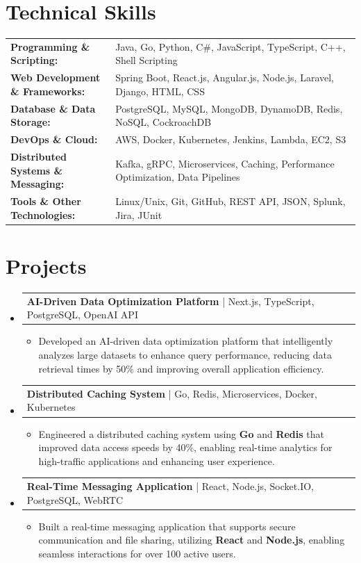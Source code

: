 \documentclass[letterpaper,10pt]{article}
\makeatletter
\newcommand{\resumeItem}[1]{
  \item{\fontsize{8pt}{9pt}\selectfont
    #1 \vspace{-3pt}
  }
}
\newcommand{\resumeProjectHeading}[2]{
    \item
    \begin{tabular*}{1.001\textwidth}{l@{\extracolsep{\fill}}r}
      \fontsize{8.5pt}{10pt}#1 & \textbf{\fontsize{8.5pt}{10pt} #2}\\
    \end{tabular*}\vspace{-7pt}
}
\newcommand{\resumeSubHeadingListStart}{\begin{itemize}[leftmargin=0pt, label={}]}
\newcommand{\resumeSubHeadingListEnd}{\end{itemize}}
\newcommand{\resumeItemListStart}{\begin{itemize}[leftmargin=*]}
\newcommand{\resumeItemListEnd}{\end{itemize}\vspace{-5pt}}
\makeatother
\begin{document}
\section{Technical Skills}
        \vspace{-14pt}
        \begin{table}[h]
            \fontsize{8pt}{9pt}\selectfont
            \begin{tabular}{p{0.3\linewidth} p{0.7\linewidth}}
                \textbf{Programming \& Scripting:} & Java, Go, Python, C\#, JavaScript, TypeScript, C++, Shell Scripting \\
                \textbf{Web Development \& Frameworks:} & Spring Boot, React.js, Angular.js, Node.js, Laravel, Django, HTML, CSS \\
                \textbf{Database \& Data Storage:} & PostgreSQL, MySQL, MongoDB, DynamoDB, Redis, NoSQL, CockroachDB \\
                \textbf{DevOps \& Cloud:} & AWS, Docker, Kubernetes, Jenkins, Lambda, EC2, S3 \\
                \textbf{Distributed Systems \& Messaging:} & Kafka, gRPC, Microservices, Caching, Performance Optimization, Data Pipelines \\
                \textbf{Tools \& Other Technologies:} & Linux/Unix, Git, GitHub, REST API, JSON, Splunk, Jira, JUnit \\
            \end{tabular}
        \end{table}
 \vspace{-18pt}

\section{Projects}
    \vspace{-5pt}
    \resumeSubHeadingListStart
          \resumeProjectHeading
            {\textbf{AI-Driven Data Optimization Platform} | Next.js, TypeScript, PostgreSQL, OpenAI API}{}
            \resumeItemListStart
                \resumeItem{Developed an AI-driven data optimization platform that intelligently analyzes large datasets to enhance query performance, reducing data retrieval times by 50\% and improving overall application efficiency.}
            \resumeItemListEnd
        \vspace{-12pt}
    
        \resumeProjectHeading
            {\textbf{Distributed Caching System} | Go, Redis, Microservices, Docker, Kubernetes}{}
        \resumeItemListStart
                \resumeItem{Engineered a distributed caching system using \textbf{Go} and \textbf{Redis} that improved data access speeds by 40\%, enabling real-time analytics for high-traffic applications and enhancing user experience.}
        \resumeItemListEnd
      \vspace{-12pt}
      \resumeProjectHeading
        {\textbf{Real-Time Messaging Application} | React, Node.js, Socket.IO, PostgreSQL, WebRTC}{}
    \resumeItemListStart
            \resumeItem{Built a real-time messaging application that supports secure communication and file sharing, utilizing \textbf{React} and \textbf{Node.js}, enabling seamless interactions for over 100 active users.}
    \resumeItemListEnd
    \resumeSubHeadingListEnd
\end{document}
